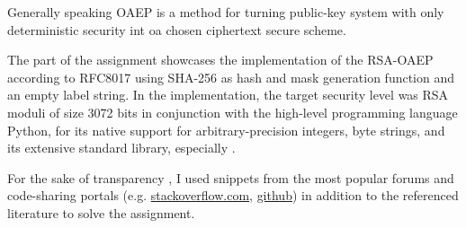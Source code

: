 \documentclass[10pt,a4paper]{article}
\begin{document}
Generally speaking OAEP is a method for turning public-key system with only deterministic security int oa chosen ciphertext secure scheme. \cite{Damgaard2025,Bellare1995,Paillier2006,Kilian2001}

The part of the assignment showcases the implementation of the RSA-OAEP according to RFC8017 \cite{rfc8017} using SHA-256 as hash and mask generation function and an empty label string. In the implementation, the target security level was RSA moduli of size 3072 bits in conjunction with the high-level programming language Python, for its native support for arbitrary-precision integers, byte strings, and its extensive standard library, especially \cite{pyhashlib}.

For the sake of transparency , I used snippets from the most popular forums and code-sharing portals (e.g. \url{stackoverflow.com}, \url{github}) in addition to the referenced literature to solve the assignment. 






\end{document}
